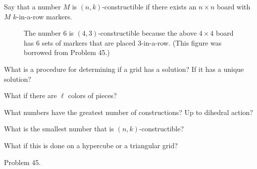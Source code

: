 \documentclass{article}
\begin{document}
  Say that a number $M$ is $(n, k)$-constructible if there exists an $n\times n$
  board with $M$ $k$-in-a-row markers.
  \begin{figure}[!h]
    \centering
    \caption{
      The number $6$ is $(4, 3)$-constructible because the above $4 \times 4$
      board has $6$ sets of markers that are placed $3$-in-a-row.
      (This figure was borrowed from Problem 45.)
    }
  \end{figure}
\begin{question}
  What is a procedure for determining if a grid has a solution? If it has a
  unique solution?
\end{question}
\begin{related}
  \item What if there are $\ell$ colors of pieces?
  \item What numbers have the greatest number of constructions? Up to dihedral
    action?
  \item What is the smallest number that is $(n, k)$-constructible?
  \item What if this is done on a hypercube or a triangular grid?
\end{related}
\begin{references}
  \item Problem 45.
\end{references}
\end{document}
